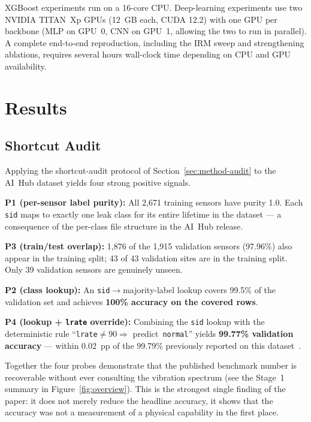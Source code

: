 \documentclass[sensors,article,submit,pdftex,oneauthor]{Definitions/mdpi}
\begin{document}
XGBoost experiments run on a 16-core CPU. Deep-learning
experiments use two NVIDIA TITAN~Xp GPUs (12~GB each, CUDA
12.2) with one GPU per backbone (MLP on GPU~0, CNN on
GPU~1, allowing the two to run in parallel). A complete
end-to-end reproduction, including the IRM sweep and
strengthening ablations, requires several hours wall-clock time
depending on CPU and GPU availability.

\section{Results}\label{sec:results}

\subsection{Shortcut Audit}\label{sec:res-audit}

Applying the shortcut-audit protocol of
Section~\ref{sec:method-audit} to the AI~Hub dataset yields
four strong positive signals.

\textbf{P1 (per-sensor label purity):} All 2{,}671 training
sensors have purity 1.0. Each \texttt{sid} maps to exactly one
leak class for its entire lifetime in the dataset --- a
consequence of the per-class file structure in the AI~Hub
release.

\textbf{P3 (train/test overlap):} 1{,}876 of the 1{,}915
validation sensors (97.96\%) also appear in the training
split; 43 of 43 validation sites are in the training split.
Only 39 validation sensors are genuinely unseen.

\textbf{P2 (class lookup):} An \texttt{sid}$\to$majority-label
lookup covers 99.5\% of the validation set and achieves
\textbf{100\% accuracy on the covered rows}.

\textbf{P4 (lookup + \texttt{lrate} override):} Combining the
\texttt{sid} lookup with the deterministic rule
``\texttt{lrate}$\neq 90 \Rightarrow$
predict~\texttt{normal}'' yields \textbf{99.77\% validation
accuracy} --- within 0.02~pp of the 99.79\% previously reported
on this dataset~\cite{lee2023leak}.

Together the four probes demonstrate that the published
benchmark number is recoverable without ever consulting the
vibration spectrum (see the Stage~1 summary in
Figure~\ref{fig:overview}). This is the strongest single
finding of the paper: it does not merely reduce the headline
accuracy, it shows that the accuracy was not a measurement of
a physical capability in the first place.
\end{document}

